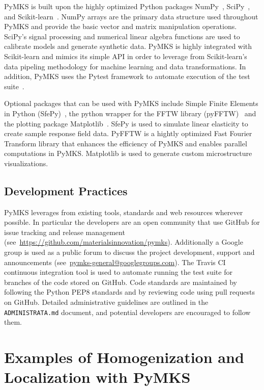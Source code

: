 \documentclass{bmcart}
\begin{document}
PyMKS is built upon the highly optimized Python packages
NumPy~\cite{van2011numpy}, SciPy~\cite{jones2014scipy}, and
Scikit-learn~\cite{pedregosa2011scikit}. NumPy arrays are the primary
data structure used throughout PyMKS and provide the basic vector and
matrix manipulation operations. SciPy's signal processing and
numerical linear algebra functions are used to calibrate models and
generate synthetic data. PyMKS is highly integrated with Scikit-learn
and mimics its simple API in order to leverage from Scikit-learn's
data pipeling methodology for machine learning and data
transformations. In addition, PyMKS uses the Pytest framework to
automate execution of the test suite~\cite{pytest2016}.

Optional packages that can be used with PyMKS include Simple Finite
Elements in Python (SfePy)~\cite{cimrman2014sfepy}, the python wrapper
for the FFTW library (pyFFTW)~\cite{frigo1998fftw} and the plotting
package Matplotlib~\cite{hunter2007matplotlib}. SfePy is used to
simulate linear elasticity to create sample response field
data. PyFFTW is a hightly optimized Fast Fourier Transform library
that enhances the efficiency of PyMKS and enables parallel
computations in PyMKS. Matplotlib is used to generate custom
microstructure visualizations.

\subsection{Development Practices}

PyMKS leverages from existing tools, standards and web resources
wherever possible. In particular the developers are an open community
that use GitHub for issue tracking and release management
(see~\url{https://github.com/materialsinnovation/pymks}). Additionally
a Google group is used as a public forum to discuss the project
development, support and announcements
(see~\url{pymks-general@googlegroups.com}). The Travis CI continuous
integration tool is used to automate running the test suite for
branches of the code stored on GitHub. Code standards are maintained
by following the Python PEP8 standards and by reviewing code using
pull requests on GitHub. Detailed administrative guidelines are
outlined in the \texttt{ADMINISTRATA.md} document, and potential
developers are encouraged to follow them.

\section{Examples of Homogenization and Localization with PyMKS}
\end{document}
